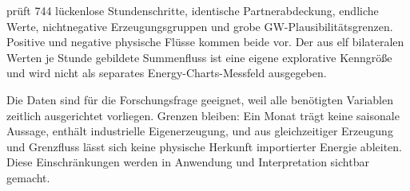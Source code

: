  prüft 744 lückenlose Stundenschritte,
identische Partnerabdeckung, endliche Werte, nichtnegative Erzeugungsgruppen
und grobe GW-Plausibilitätsgrenzen. Positive und negative physische Flüsse
kommen beide vor. Der aus elf bilateralen Werten je Stunde gebildete Summenfluss
ist eine eigene explorative Kenngrö{\ss}e und wird nicht als separates
Energy-Charts-Messfeld ausgegeben.

Die Daten sind für die Forschungsfrage geeignet, weil alle benötigten
Variablen zeitlich ausgerichtet vorliegen. Grenzen bleiben: Ein Monat trägt
keine saisonale Aussage,  enthält industrielle
Eigenerzeugung, und aus gleichzeitiger Erzeugung und Grenzfluss lässt sich keine
physische Herkunft importierter Energie ableiten. Diese Einschränkungen werden
in Anwendung und Interpretation sichtbar gemacht.
